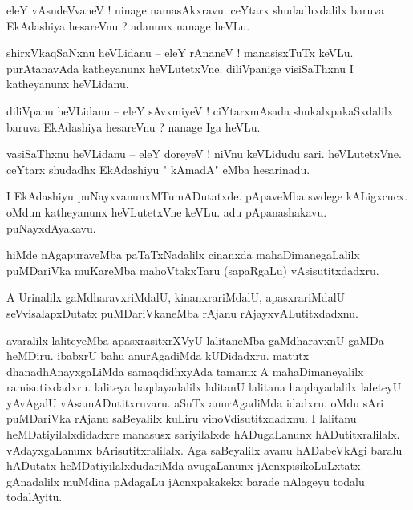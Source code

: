 \documentclass{article}
\begin{document}

\begin{mn}%
eleY vAsudeVvaneV ! ninage namasAkxravu. ceYtarx shudadhxdalilx baruva EkAdashiya hesareVnu ? 
adanunx nanage heVLu.
\end{mn}

\begin{mn}%
shirxVkaqSaNxnu heVLidanu -- eleY rAnaneV ! manasisxTuTx keVLu. purAtanavAda katheyanunx 
heVLutetxVne. diliVpanige visiSaThxnu I katheyanunx heVLidanu.
\end{mn}

\begin{mn}%
diliVpanu heVLidanu -- eleY sAvxmiyeV ! ciYtarxmAsada shukalxpakaSxdalilx baruva EkAdashiya 
hesareVnu ? nanage Iga heVLu.
\end{mn}

\begin{mn}%
vasiSaThxnu heVLidanu -- eleY doreyeV ! niVnu keVLidudu sari. heVLutetxVne. ceYtarx shudadhx 
EkAdashiyu " kAmadA" eMba hesarinadu.
\end{mn}

\begin{mn}%
I EkAdashiyu puNayxvanunxMTumADutatxde. pApaveMba swdege kALigxcucx. oMdun katheyanunx heVLutetxVne 
keVLu. adu pApanashakavu. puNayxdAyakavu.
\end{mn}

\begin{mn}%
hiMde nAgapuraveMba paTaTxNadalilx cinanxda mahaDimanegaLalilx puMDariVka muKareMba mahoVtakxTaru 
(sapaRgaLu) vAsisutitxdadxru.
\end{mn}

\begin{mn}%
A Urinalilx gaMdharavxriMdalU, kinanxrariMdalU, apasxrariMdalU seVvisalapxDutatx puMDariVkaneMba 
rAjanu rAjayxvALutitxdadxnu.
\end{mn}

\begin{mn}%
avaralilx laliteyeMba apasxrasitxrXVyU lalitaneMba gaMdharavxnU gaMDa heMDiru. ibabxrU bahu 
anurAgadiMda kUDidadxru. matutx dhanadhAnayxgaLiMda samaqdidhxyAda tamamx A mahaDimaneyalilx 
ramisutixdadxru. laliteya haqdayadalilx lalitanU lalitana haqdayadalilx laleteyU yAvAgalU 
vAsamADutitxruvaru. aSuTx anurAgadiMda idadxru. oMdu sAri puMDariVka rAjanu saBeyalilx kuLiru 
vinoVdisutitxdadxnu. I lalitanu heMDatiyilalxdidadxre manasusx sariyilalxde hADugaLanunx 
hADutitxralilalx. vAdayxgaLanunx bArisutitxralilalx. Aga saBeyalilx avanu hADabeVkAgi baralu 
hADutatx heMDatiyilalxdudariMda avugaLanunx jAcnxpisikoLuLxtatx gAnadalilx muMdina pAdagaLu 
jAcnxpakakekx barade nAlageyu todalu todalAyitu.
\end{mn}
\end{document}
